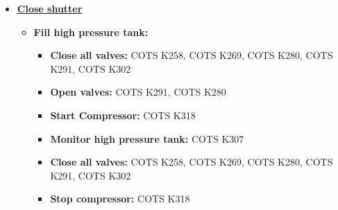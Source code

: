 \begin{itemize}
	\item \underline{\textbf{Close shutter}}
		\begin{itemize}
			\item \textbf{Fill high pressure tank:}
				\begin{itemize}
					\item \textbf{Close all valves:} COTS K258, COTS K269, COTS K280, COTS K291, COTS K302
					\item \textbf{Open valves:} COTS K291, COTS K280
					\item \textbf{Start Compressor:} COTS K318
					\item \textbf{Monitor high pressure tank:} COTS K307
					\item \textbf{Close all valves:} COTS K258, COTS K269, COTS K280, COTS K291, COTS K302
					\item \textbf{Stop compressor:} COTS K318
				\end{itemize}
		\end{itemize}
\end{itemize}

